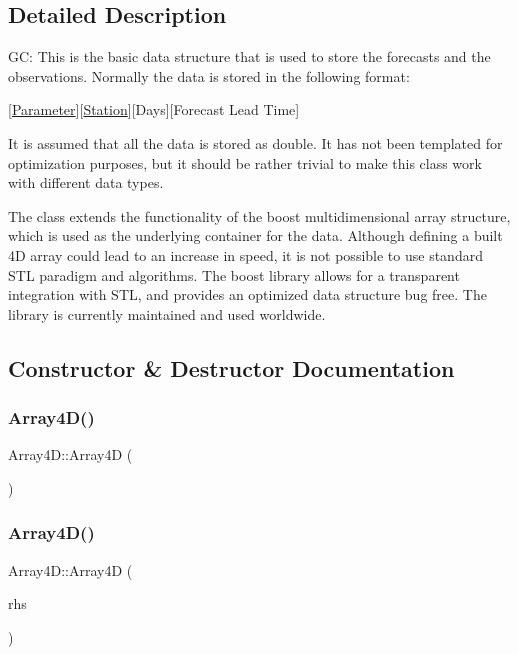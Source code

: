 \subsection{Detailed Description}
GC\+: This is the basic data structure that is used to store the forecasts and the observations. Normally the data is stored in the following format\+:

\mbox{[}\mbox{\hyperlink{class_parameter}{Parameter}}\mbox{]}\mbox{[}\mbox{\hyperlink{class_station}{Station}}\mbox{]}\mbox{[}Days\mbox{]}\mbox{[}Forecast Lead Time\mbox{]}

It is assumed that all the data is stored as double. It has not been templated for optimization purposes, but it should be rather trivial to make this class work with different data types.

The class extends the functionality of the boost multidimensional array structure, which is used as the underlying container for the data. Although defining a built 4D array could lead to an increase in speed, it is not possible to use standard S\+TL paradigm and algorithms. The boost library allows for a transparent integration with S\+TL, and provides an optimized data structure bug free. The library is currently maintained and used worldwide. 

\subsection{Constructor \& Destructor Documentation}
\mbox{\label{class_array4_d_a1bc84c0dcc22ed0e218040b01f56b816}} 
\subsubsection{\texorpdfstring{Array4\+D()}{Array4D()}\hspace{0.1cm}{\footnotesize\ttfamily [1/5]}}
{\footnotesize\ttfamily Array4\+D\+::\+Array4D (\begin{DoxyParamCaption}{ }\end{DoxyParamCaption})}

\mbox{\label{class_array4_d_a7395b077e949df98c4cfe0c0aa93f2a8}} 
\subsubsection{\texorpdfstring{Array4\+D()}{Array4D()}\hspace{0.1cm}{\footnotesize\ttfamily [2/5]}}
{\footnotesize\ttfamily Array4\+D\+::\+Array4D (\begin{DoxyParamCaption}\item[{const \mbox{\hyperlink{class_array4_d}{Array4D}} \&}]{rhs }\end{DoxyParamCaption})}

